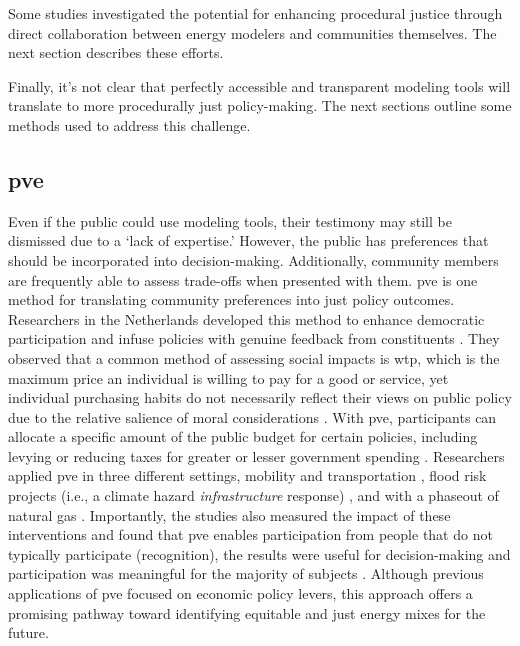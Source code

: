Some studies investigated the potential for enhancing
procedural justice through direct collaboration between energy modelers and
communities themselves. The next section describes these efforts.

Finally, it's not clear that perfectly accessible and transparent modeling tools
will translate to more procedurally just policy-making. The next sections
outline some methods used to address this challenge.

\subsection{\Acl{pve}}

Even if the public could use modeling tools, their testimony may still be
dismissed due to a `lack of expertise.' However, the public has preferences that
should be incorporated into decision-making. Additionally, community members are
frequently able to assess trade-offs when presented with them. \Acf{pve} is one
method for translating community preferences into just policy outcomes.
Researchers in the Netherlands developed this method to enhance democratic
participation and infuse policies with genuine feedback from constituents
\cite{mouter_introduction_2019}. They observed that a common method of assessing
social impacts is \ac{wtp}, which is the maximum price an individual is willing
to pay for a good or service, yet individual purchasing habits do not
necessarily reflect their views on public policy due to the relative salience of
moral considerations \cite{mouter_introduction_2019}. With \ac{pve},
participants can allocate a specific amount of the public budget for certain
policies, including levying or reducing taxes for greater or lesser government
spending \cite{mouter_introduction_2019}. Researchers applied \ac{pve} in three
different settings, mobility and transportation \cite{mouter_contrasting_2021},
flood risk projects (i.e., a climate hazard \textit{infrastructure} response)
\cite{dekker_economics_2019}, and with a phaseout of natural gas
\cite{mouter_including_2021}. Importantly, the studies also measured the impact
of these interventions and found that \ac{pve} enables participation from people
that do not typically participate (recognition), the results were useful for
decision-making and participation was meaningful for the majority of subjects
\cite{mouter_including_2021}. Although previous applications of \ac{pve} focused
on economic policy levers, this approach offers a promising pathway toward
identifying equitable and just energy mixes for the future.

